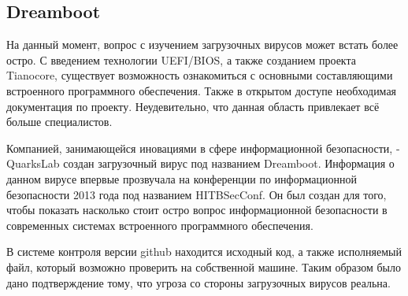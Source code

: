 \subsection{Dreamboot}
На данный момент, вопрос с изучением загрузочных вирусов может встать более остро.
С введением технологии UEFI/BIOS, а также созданием проекта Tianocore,
	существует возможность ознакомиться с основными составляющими встроенного программного обеспечения.
Также в открытом доступе необходимая документация по проекту.
Неудевительно, что данная область привлекает всё больше специалистов.

Компанией, занимающейся иновациями в сфере информационной безопасности, - QuarksLab создан загрузочный вирус под названием Dreamboot\cite{proj:Dreamboot}.
Информация о данном вирусе впервые прозвучала на конференции по информационной безопасности 2013 года под названием HITBSecConf.
Он был создан для того,
	чтобы показать насколько стоит остро вопрос информационной безопасности в современных системах встроенного программного обеспечения.

В системе контроля версии github находится исходный код,
	а также исполняемый файл,
		который возможно проверить на собственной машине.
Таким образом было дано подтверждение тому,
	что угроза со стороны загрузочных вирусов реальна.
